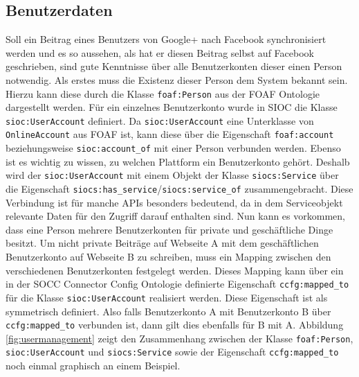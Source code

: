 
\subsection{Benutzerdaten} %
\label{sub:benutzerdaten}

Soll ein Beitrag eines Benutzers von Google+ nach Facebook synchronisiert werden und es so aussehen, als hat er diesen Beitrag selbst auf Facebook geschrieben, sind gute Kenntnisse über alle Benutzerkonten dieser einen Person notwendig. Als erstes muss die Existenz dieser Person dem System bekannt sein. Hierzu kann diese durch die Klasse \texttt{foaf:Person} aus der FOAF Ontologie dargestellt werden. Für ein einzelnes Benutzerkonto wurde in SIOC die Klasse \texttt{sioc:UserAccount} definiert. Da \texttt{sioc:UserAccount} eine Unterklasse von \texttt{OnlineAccount} aus FOAF ist, kann diese über die Eigenschaft \texttt{foaf:account} beziehungsweise \texttt{sioc:account\_of} mit einer Person verbunden werden. Ebenso ist es wichtig zu wissen, zu welchen Plattform ein Benutzerkonto gehört. Deshalb wird der \texttt{sioc:UserAccount} mit einem Objekt der Klasse \texttt{siocs:Service} über die Eigenschaft \texttt{siocs:has\_service}/\texttt{siocs:service\_of} zusammengebracht. Diese Verbindung ist für manche APIs besonders bedeutend, da in dem Serviceobjekt relevante Daten für den Zugriff darauf enthalten sind. Nun kann es vorkommen, dass eine Person mehrere Benutzerkonten für private und geschäftliche Dinge besitzt. Um nicht private Beiträge auf Webseite A mit dem geschäftlichen Benutzerkonto auf Webseite B zu schreiben, muss ein Mapping zwischen den verschiedenen Benutzerkonten festgelegt werden. Dieses Mapping kann über ein in der SOCC Connector Config Ontologie definierte Eigenschaft \texttt{ccfg:mapped\_to} für die Klasse \texttt{sioc:UserAccount} realisiert werden. Diese Eigenschaft ist als symmetrisch definiert. Also falls Benutzerkonto A mit Benutzerkonto B über \texttt{ccfg:mapped\_to} verbunden ist, dann gilt dies ebenfalls für B mit A. Abbildung \ref{fig:usermanagement} zeigt den Zusammenhang zwischen der Klasse \texttt{foaf:Person}, \texttt{sioc:UserAccount} und \texttt{siocs:Service} sowie der Eigenschaft \texttt{ccfg:mapped\_to} noch einmal graphisch an einem Beispiel.

